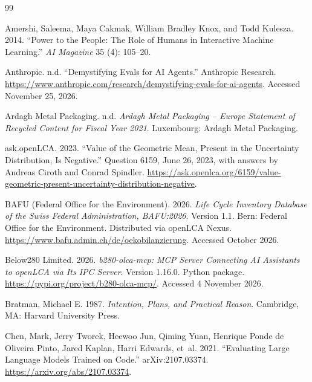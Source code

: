 \begin{thebibliography}{99}
\small

Amershi, Saleema, Maya Cakmak, William Bradley Knox, and Todd Kulesza. 2014. ``Power to the People: The Role of Humans in Interactive Machine Learning.'' \emph{AI Magazine} 35 (4): 105--20.

Anthropic. n.d. ``Demystifying Evals for AI Agents.'' Anthropic Research. \url{https://www.anthropic.com/research/demystifying-evals-for-ai-agents}. Accessed November 25, 2026.

Ardagh Metal Packaging. n.d. \emph{Ardagh Metal Packaging -- Europe Statement of Recycled Content for Fiscal Year 2021}. Luxembourg: Ardagh Metal Packaging.

ask.openLCA. 2023. ``Value of the Geometric Mean, Present in the Uncertainty Distribution, Is Negative.'' Question 6159, June 26, 2023, with answers by Andreas Ciroth and Conrad Spindler. \url{https://ask.openlca.org/6159/value-geometric-present-uncertainty-distribution-negative}.

BAFU (Federal Office for the Environment). 2026. \emph{Life Cycle Inventory Database of the Swiss Federal Administration, BAFU:2026}. Version 1.1. Bern: Federal Office for the Environment. Distributed via openLCA Nexus. \url{https://www.bafu.admin.ch/de/oekobilanzierung}. Accessed October 2026.

Below280 Limited. 2026. \emph{b280-olca-mcp: MCP Server Connecting AI Assistants to openLCA via Its IPC Server}. Version 1.16.0. Python package. \url{https://pypi.org/project/b280-olca-mcp/}. Accessed 4 November 2026.

Bratman, Michael E. 1987. \emph{Intention, Plans, and Practical Reason}. Cambridge, MA: Harvard University Press.

Chen, Mark, Jerry Tworek, Heewoo Jun, Qiming Yuan, Henrique Ponde de Oliveira Pinto, Jared Kaplan, Harri Edwards, et~al. 2021. ``Evaluating Large Language Models Trained on Code.'' arXiv:2107.03374. \url{https://arxiv.org/abs/2107.03374}.


\end{thebibliography}
